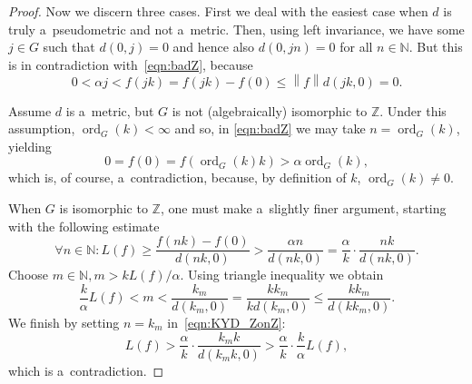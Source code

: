 \documentclass[10pt,a4paper]{amsart}
\newcommand{\N}{\mathbb{N}}
\newcommand{\Z}{\mathbb{Z}}
\newcommand{\norm}[1]{\left\| #1 \right\|}
\newcommand{\ord}{\operatorname{ord}}
\begin{document}
\begin{proof}
		Now we discern three cases. First we deal with the easiest case when $d$ is truly a~pseudometric and not a~metric. Then, using left invariance, we have some $j \in G$ such that $d(0, j) = 0$ and hence also $d(0, jn) = 0$ for all $n \in \N$. But this is in contradiction with~\eqref{eqn:badZ}, because
		\begin{equation*}
			0 < \alpha j < f(jk) = f(jk) - f(0) \leq \norm{f} d(jk, 0) = 0.
		\end{equation*}
		
		Assume $d$ is a~metric, but $G$ is not (algebraically) isomorphic to $\Z$. Under this assumption, $\ord_G(k) < \infty$ and so, in \eqref{eqn:badZ} we may take $n = \ord_G(k)$, yielding
		\begin{equation*}
			0 = f(0) = f(\ord_G(k) k) > \alpha \ord_G(k),
		\end{equation*}
		which is, of course, a~contradiction, because, by definition of $k$, $\ord_G(k) \neq 0$.
		
		When $G$ is isomorphic to $\Z$, one must make a~slightly finer argument, starting with the following estimate
		\begin{equation} \label{eqn:KYD_ZonZ}
			\forall n \in \N \colon L(f) \geq \frac{f(nk) - f(0)}{d(nk, 0)}
			> \frac{\alpha n}{d(nk, 0)}
			= \frac{\alpha}{k} \cdot \frac{nk}{d(nk, 0)}.
		\end{equation}
		Choose $m \in \N, m > kL(f) /\alpha$. Using triangle inequality we obtain
		\begin{equation*}
			\frac{k}{\alpha} L(f)
			< m
			< \frac{k_m}{d(k_m, 0)}
			= \frac{kk_m}{kd(k_m, 0)}
			\leq \frac{kk_m}{d(kk_m, 0)}.
		\end{equation*}
		We finish by setting $n = k_m$ in~\eqref{eqn:KYD_ZonZ}:
		\begin{equation*}
			L(f) >
			\frac{\alpha}{k} \cdot \frac{k_m k}{d(k_m k, 0)}
			> \frac{\alpha}{k} \cdot \frac{k}{\alpha} L(f),
		\end{equation*}
		which is a~contradiction.
	\end{proof}
\end{document}
